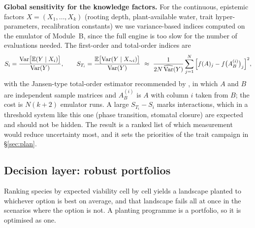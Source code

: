 \textbf{Global sensitivity for the knowledge factors.} For the continuous, epistemic factors $X=(X_1,\dots,X_k)$ (rooting depth, plant-available water, trait hyper-parameters, recalibration constants) we use variance-based indices computed on the emulator of Module~B, since the full engine is too slow for the number of evaluations needed. The first-order and total-order indices are
\begin{equation}\label{eq:sobol}
S_i=\frac{\mathrm{Var}\big[\E(Y\mid X_i)\big]}{\mathrm{Var}(Y)},\qquad S_{T_i}=\frac{\E\big[\mathrm{Var}(Y\mid X_{\sim i})\big]}{\mathrm{Var}(Y)}\ \approx\ \frac{1}{2N\,\widehat{\mathrm{Var}}(Y)}\sum_{j=1}^{N}\Big[f(A)_j-f\big(A_B^{(i)}\big)_j\Big]^2,
\end{equation}
with the Jansen-type total-order estimator recommended by \citet{Saltelli2010}, in which $A$ and $B$ are independent sample matrices and $A_B^{(i)}$ is $A$ with column $i$ taken from $B$; the cost is $N(k+2)$ emulator runs. A large $S_{T_i}-S_i$ marks interactions, which in a threshold system like this one (phase transition, stomatal closure) are expected and should not be hidden. The result is a ranked list of which measurement would reduce uncertainty most, and it sets the priorities of the trait campaign in \S\ref{sec:plan}.

\subsection{Decision layer: robust portfolios}
Ranking species by expected viability cell by cell yields a landscape planted to whichever option is best on average, and that landscape fails all at once in the scenarios where the option is not. A planting programme is a portfolio, so it is optimised as one.

